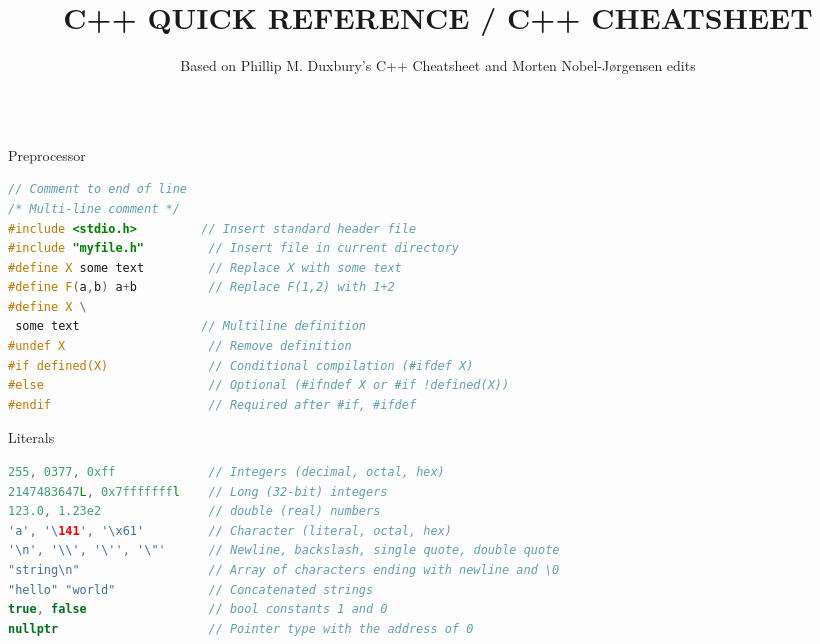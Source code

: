 \documentclass[final]{beamer}
\title{C++ QUICK REFERENCE / C++ CHEATSHEET}
\author{Based on Phillip M. Duxbury's C++ Cheatsheet and Morten Nobel-Jørgensen edits}
\begin{document}
\begin{frame}[t,fragile]

\begin{columns}[t,totalwidth=\paperwidth, colsep=0.015\paperwidth]

\begin{column}{0.32\paperwidth}

\begin{block}{Preprocessor}
\begin{lstlisting}[language=C++]
// Comment to end of line
/* Multi-line comment */
#include <stdio.h>         // Insert standard header file
#include "myfile.h"         // Insert file in current directory
#define X some text         // Replace X with some text
#define F(a,b) a+b          // Replace F(1,2) with 1+2
#define X \
 some text                 // Multiline definition
#undef X                    // Remove definition
#if defined(X)              // Conditional compilation (#ifdef X)
#else                       // Optional (#ifndef X or #if !defined(X))
#endif                      // Required after #if, #ifdef
\end{lstlisting}
\end{block}

\begin{block}{Literals}
\begin{lstlisting}[language=C++]
255, 0377, 0xff             // Integers (decimal, octal, hex)
2147483647L, 0x7fffffffl    // Long (32-bit) integers
123.0, 1.23e2               // double (real) numbers
'a', '\141', '\x61'         // Character (literal, octal, hex)
'\n', '\\', '\'', '\"'      // Newline, backslash, single quote, double quote
"string\n"                  // Array of characters ending with newline and \0
"hello" "world"             // Concatenated strings
true, false                 // bool constants 1 and 0
nullptr                     // Pointer type with the address of 0
\end{lstlisting}
\end{block}


\end{column}
\end{columns}
\end{frame}
\end{document}
